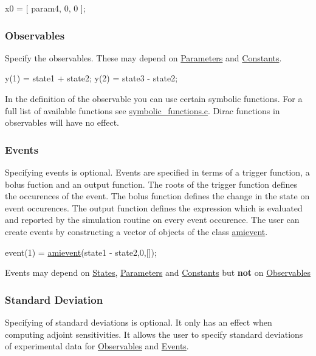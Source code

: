 \begin{DoxyCode}
x0 = [ param4, 0, 0 ]; 
\end{DoxyCode}
\hypertarget{def_simu_observables}{}\subsubsection{Observables}\label{def_simu_observables}
Specify the observables. These may depend on \hyperlink{def_simu_parameters}{Parameters} and \hyperlink{def_simu_constants}{Constants}.


\begin{DoxyCode}
y(1) = state1 + state2;
y(2) = state3 - state2;
\end{DoxyCode}


In the definition of the observable you can use certain symbolic functions. For a full list of available functions see \hyperlink{symbolic__functions_8c}{symbolic\+\_\+functions.\+c}. Dirac functions in observables will have no effect.\hypertarget{def_simu_events}{}\subsubsection{Events}\label{def_simu_events}
Specifying events is optional. Events are specified in terms of a trigger function, a bolus fuction and an output function. The roots of the trigger function defines the occurences of the event. The bolus function defines the change in the state on event occurences. The output function defines the expression which is evaluated and reported by the simulation routine on every event occurence. The user can create events by constructing a vector of objects of the class \hyperlink{classamievent}{amievent}.


\begin{DoxyCode}
event(1) = \hyperlink{classamievent}{amievent}(state1 - state2,0,[]); 
\end{DoxyCode}


Events may depend on \hyperlink{def_simu_states}{States}, \hyperlink{def_simu_parameters}{Parameters} and \hyperlink{def_simu_constants}{Constants} but {\bfseries not} on \hyperlink{def_simu_observables}{Observables}\hypertarget{def_simu_std}{}\subsubsection{Standard Deviation}\label{def_simu_std}
Specifying of standard deviations is optional. It only has an effect when computing adjoint sensitivities. It allows the user to specify standard deviations of experimental data for \hyperlink{def_simu_observables}{Observables} and \hyperlink{def_simu_events}{Events}.


